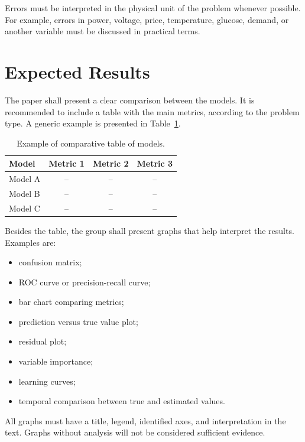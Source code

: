 \documentclass[a4paper]{ifacconf}
\begin{document}
Errors must be interpreted in the physical unit of the problem whenever possible. For example, errors in power, voltage, price, temperature, glucose, demand, or another variable must be discussed in practical terms.

\section{Expected Results}

The paper shall present a clear comparison between the models. It is recommended to include a table with the main metrics, according to the problem type. A generic example is presented in Table~\ref{tab:models}.

\begin{table}[hb]
\begin{center}
\caption{Example of comparative table of models.}\label{tab:models}
\begin{tabular}{lccc}
Model & Metric 1 & Metric 2 & Metric 3 \\\hline
Model A & -- & -- & -- \\
Model B & -- & -- & -- \\
Model C & -- & -- & -- \\\hline
\end{tabular}
\end{center}
\end{table}

Besides the table, the group shall present graphs that help interpret the results. Examples are:
\begin{itemize}
    \item confusion matrix;
    \item ROC curve or precision-recall curve;
    \item bar chart comparing metrics;
    \item prediction versus true value plot;
    \item residual plot;
    \item variable importance;
    \item learning curves;
    \item temporal comparison between true and estimated values.
\end{itemize}

All graphs must have a title, legend, identified axes, and interpretation in the text. Graphs without analysis will not be considered sufficient evidence.
\end{document}
